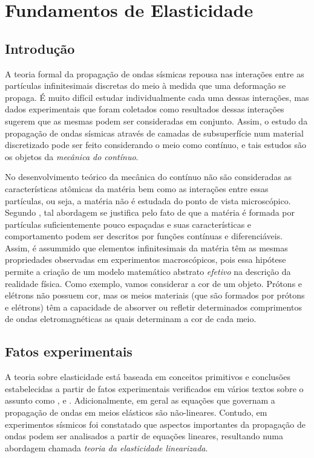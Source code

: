 \chapter{Fundamentos de Elasticidade}\label{sec.fund_elast}

\section{Introdu\c{c}\~ao}
A teoria formal da propaga\c{c}\~ao de ondas s\'ismicas repousa nas intera\c{c}\~oes entre as part\'iculas infinitesimais discretas do meio \`a medida que uma deforma\c{c}\~ao se propaga. \'E muito dif\'icil estudar individualmente cada uma dessas intera\c{c}\~oes, mas dados experimentais que foram coletados como resultados dessas intera\c{c}\~oes sugerem que as mesmas podem ser consideradas em conjunto. Assim, o estudo da propaga\c{c}\~ao de ondas s\'ismicas atrav\'es de camadas de subsuperf\'icie num material discretizado pode ser feito considerando o meio como cont\'inuo, e tais estudos s\~ao os objetos da \textit{mec\^anica do cont\'inuo}. 

No desenvolvimento te\'orico da mec\^anica do cont\'inuo n\~ao s\~ao consideradas as caracter\'isticas at\^omicas da mat\'eria bem como as intera\c{c}\~oes entre essas part\'iculas, ou seja, a mat\'eria n\~ao \'e estudada do ponto de vista microsc\'opico. Segundo \cite{slawinski}, tal abordagem se justifica pelo fato de que a mat\'eria \'e formada por part\'iculas suficientemente pouco espa\c{c}adas e suas caracter\'isticas e comportamento podem ser descritos por fun\c{c}\~oes cont\'inuas e diferenci\'aveis. Assim, \'e assummido que elementos infinitesimais da mat\'eria t\^em as mesmas propriedades observadas em experimentos macrosc\'opicos, pois essa hip\'otese permite a cria\c{c}\~ao de um modelo matem\'atico abstrato \textit{efetivo} na descri\c{c}\~ao da realidade f\'isica. Como exemplo, vamos considerar a cor de um objeto. Pr\'otons e el\'etrons n\~ao possuem cor, mas os meios materiais (que s\~ao formados por pr\'otons e el\'etrons) t\^em a capacidade de absorver ou refletir determinados comprimentos de ondas eletromagn\'eticas as quais determinam a cor de cada meio. %


\section{Fatos experimentais}
A teoria sobre elasticidade est\'a baseada em conceitos primitivos e conclus\~oes estabelecidas a partir de fatos experimentais verificados em v\'arios textos sobre o assunto como \cite{liu}, \cite{dahlem} e \cite{slawinski}. Adicionalmente, em geral as equa\c{c}\~oes que governam a propaga\c{c}\~ao de ondas em meios el\'asticos s\~ao n\~ao-lineares. Contudo, em experimentos s\'ismicos foi constatado que aspectos importantes da propaga\c{c}\~ao de ondas podem ser analisados a partir de equa\c{c}\~oes lineares, resultando numa abordagem chamada \textit{teoria da elasticidade linearizada}.

